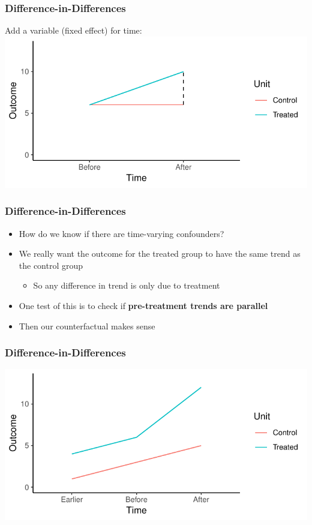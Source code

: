 \documentclass[xcolor=x11names,compress]{beamer}\usepackage[]{graphicx}\usepackage[]{color}
\makeatletter
\def\maxwidth{ %
  \ifdim\Gin@nat@width>\linewidth
    \linewidth
  \else
    \Gin@nat@width
  \fi
}
\newenvironment{knitrout}{}{} %
\renewcommand{\(}{\begin{columns}}
\renewcommand{\)}{\end{columns}}
\newcommand{\<}[1]{\begin{column}{#1}}
\renewcommand{\>}{\end{column}}
\makeatother
\begin{document}
\begin{frame}
\frametitle{Difference-in-Differences}
Add a variable (fixed effect) for time:
\begin{knitrout}
\color{fgcolor}
\includegraphics[width=\maxwidth]{figure/DinD_chart5-1} 

\end{knitrout}
\end{frame}

\begin{frame}
\frametitle{Difference-in-Differences}
\begin{itemize}
\item How do we know if there are time-varying confounders?
\pause
\item We really want the outcome for the treated group to have the same trend as the control group
\pause
\begin{itemize}
\item So any difference in trend is only due to treatment
\pause
\end{itemize}
\item One test of this is to check if \textbf{pre-treatment trends are parallel}
\pause
\item Then our counterfactual makes sense
\end{itemize}
\end{frame}

\begin{frame}
\frametitle{Difference-in-Differences}
\begin{knitrout}
\color{fgcolor}
\includegraphics[width=\maxwidth]{figure/DinD_chart6-1} 

\end{knitrout}
\end{frame}
\end{document}
